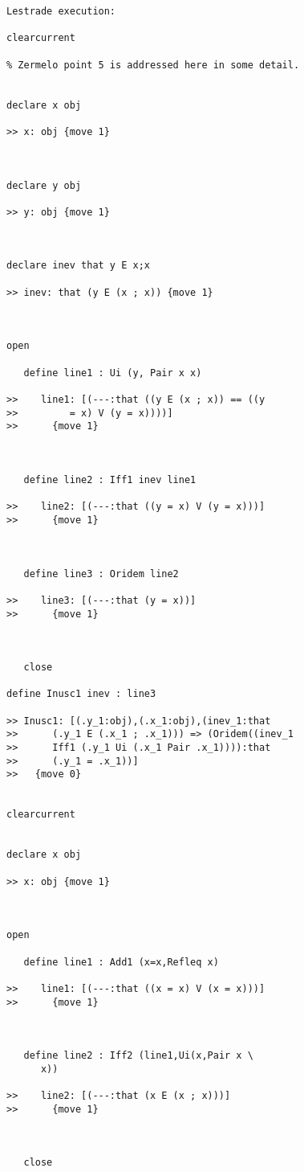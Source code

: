 \documentclass[12pt]{article}
\begin{document}
\begin{verbatim}Lestrade execution:

clearcurrent

% Zermelo point 5 is addressed here in some detail.


declare x obj

>> x: obj {move 1}



declare y obj

>> y: obj {move 1}



declare inev that y E x;x

>> inev: that (y E (x ; x)) {move 1}



open

   define line1 : Ui (y, Pair x x)

>>    line1: [(---:that ((y E (x ; x)) == ((y
>>         = x) V (y = x))))]
>>      {move 1}



   define line2 : Iff1 inev line1

>>    line2: [(---:that ((y = x) V (y = x)))]
>>      {move 1}



   define line3 : Oridem line2

>>    line3: [(---:that (y = x))]
>>      {move 1}



   close

define Inusc1 inev : line3

>> Inusc1: [(.y_1:obj),(.x_1:obj),(inev_1:that
>>      (.y_1 E (.x_1 ; .x_1))) => (Oridem((inev_1
>>      Iff1 (.y_1 Ui (.x_1 Pair .x_1)))):that
>>      (.y_1 = .x_1))]
>>   {move 0}


clearcurrent


declare x obj

>> x: obj {move 1}



open

   define line1 : Add1 (x=x,Refleq x)

>>    line1: [(---:that ((x = x) V (x = x)))]
>>      {move 1}



   define line2 : Iff2 (line1,Ui(x,Pair x \
      x))

>>    line2: [(---:that (x E (x ; x)))]
>>      {move 1}



   close


\end{verbatim}
\end{document}
